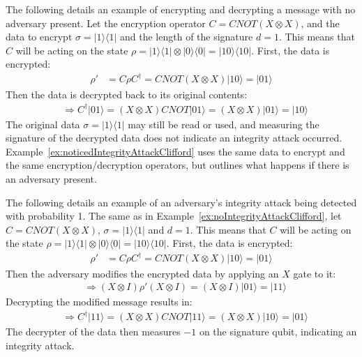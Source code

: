 \begin{example}
\label{ex:noIntegrityAttackClifford}
	The following details an example of encrypting and decrypting a message with no adversary present. Let the encryption operator $C = \mathit{CNOT}(X \otimes X)$, and the data to encrypt $\sigma = |1\rangle\langle1|$ and the length of the signature $d = 1$. This means that $C$ will be acting on the state $\rho = |1\rangle\langle1| \otimes |0\rangle\langle0| = |10\rangle\langle10|$. First, the data is encrypted:
	\begin{align}
	\rho' &= C\rho C^{\dagger} = \mathit{CNOT}(X \otimes X)|10\rangle = |01\rangle
	\end{align}
	Then the data is decrypted back to its original contents:
	\begin{align}
	& \Rightarrow C^{\dagger}|01\rangle = (X \otimes X)\mathit{CNOT}|01\rangle = (X \otimes X)|01\rangle = |10\rangle
	\end{align}
	The original data $\sigma = |1\rangle\langle1|$ may still be read or used, and measuring the signature of the decrypted data does not indicate an integrity attack occurred. Example~\ref{ex:noticedIntegrityAttackClifford} uses the same data to encrypt and the same encryption/decryption operators, but outlines what happens if there is an adversary present.
\end{example}

\begin{example}
\label{ex:noticedIntegrityAttackClifford}
	The following details an example of an adversary's integrity attack being detected with probability 1. The same as in Example~\ref{ex:noIntegrityAttackClifford}, let $C = \mathit{CNOT}(X \otimes X)$, $\sigma = |1\rangle\langle1|$ and $d = 1$. This means that $C$ will be acting on the state $\rho = |1\rangle\langle1| \otimes |0\rangle\langle0| = |10\rangle\langle10|$. First, the data is encrypted:
	\begin{align}
	\rho' &= C\rho C^{\dagger} = \mathit{CNOT}(X \otimes X)|10\rangle = |01\rangle
	\end{align}
    Then the adversary modifies the encrypted data by applying an $X$ gate to it:
	\begin{align}
	& \Rightarrow (X \otimes I) \rho' (X \otimes I) = (X \otimes I) |01\rangle = |11\rangle \label{eq:adversaryNotAttack}
	\end{align}
	Decrypting the modified message results in:
    \begin{align}
	& \Rightarrow C^{\dagger}|11\rangle = (X \otimes X)\mathit{CNOT}|11\rangle = (X \otimes X)|10\rangle = |01\rangle
	\end{align}
	The decrypter of the data then measures $-1$ on the signature qubit, indicating an integrity attack. 
\end{example}

